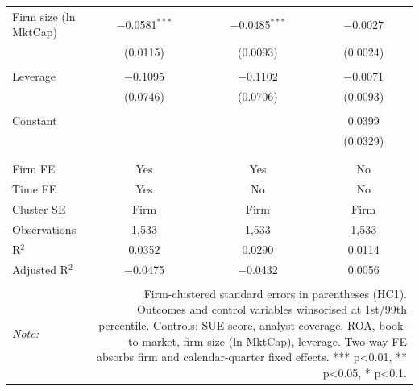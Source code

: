 \begin{table}[!htbp]
\begin{tabular}{@{\extracolsep{5pt}}lccc}
 Firm size (ln MktCap) & $-$0.0581$^{***}$ & $-$0.0485$^{***}$ & $-$0.0027 \\ 
  & (0.0115) & (0.0093) & (0.0024) \\ 
  & & & \\ 
 Leverage & $-$0.1095 & $-$0.1102 & $-$0.0071 \\ 
  & (0.0746) & (0.0706) & (0.0093) \\ 
  & & & \\ 
 Constant &  &  & 0.0399 \\ 
  &  &  & (0.0329) \\ 
  & & & \\ 
\hline \\[-1.8ex] 
Firm FE & Yes & Yes & No \\ 
Time FE & Yes & No & No \\ 
Cluster SE & Firm & Firm & Firm \\ 
Observations & 1,533 & 1,533 & 1,533 \\ 
R$^{2}$ & 0.0352 & 0.0290 & 0.0114 \\ 
Adjusted R$^{2}$ & $-$0.0475 & $-$0.0432 & 0.0056 \\ 
\hline 
\hline \\[-1.8ex] 
\textit{Note:}  & \multicolumn{3}{r}{Firm-clustered standard errors in parentheses (HC1). Outcomes and control variables winsorised at 1st/99th percentile. Controls: SUE score, analyst coverage, ROA, book-to-market, firm size (ln MktCap), leverage. Two-way FE absorbs firm and calendar-quarter fixed effects. *** p<0.01, ** p<0.05, * p<0.1.} \\ 
\end{tabular} 
\end{table} 
